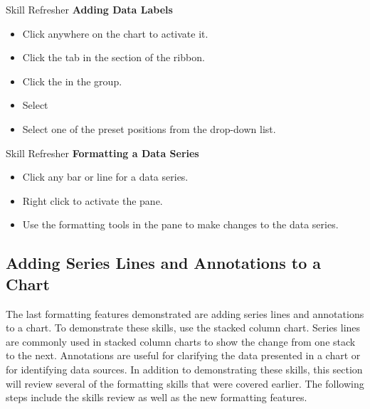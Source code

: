 \begin{center}
	\begin{sklbox}{Skill Refresher}
		\textbf{Adding Data Labels}
		\\
		\begin{itemize}
			\setlength{\itemsep}{0pt}
			\setlength{\parskip}{0pt}
			\setlength{\parsep}{0pt}

			\item Click anywhere on the chart to activate it.
			\item Click the  tab in the  section of the ribbon.
			\item Click the  in the  group.
			\item Select 
			\item Select one of the preset positions from the drop-down list.
			
		\end{itemize}
	\end{sklbox}
\end{center}

\begin{center}
	\begin{sklbox}{Skill Refresher}
		\textbf{Formatting a Data Series}
		\\
		\begin{itemize}
			\setlength{\itemsep}{0pt}
			\setlength{\parskip}{0pt}
			\setlength{\parsep}{0pt}
			
			\item Click any bar or line for a data series.
			\item Right click to activate the  pane.
			\item Use the formatting tools in the pane to make changes to the data series.
			
		\end{itemize}
	\end{sklbox}
\end{center}

\subsection{Adding Series Lines and Annotations to a Chart}

The last formatting features demonstrated are adding series lines and annotations to a chart. To demonstrate these skills, use the  stacked column chart. Series lines are commonly used in stacked column charts to show the change from one stack to the next. Annotations are useful for clarifying the data presented in a chart or for identifying data sources. In addition to demonstrating these skills, this section will review several of the formatting skills that were covered earlier. The following steps include the skills review as well as the new formatting features.

